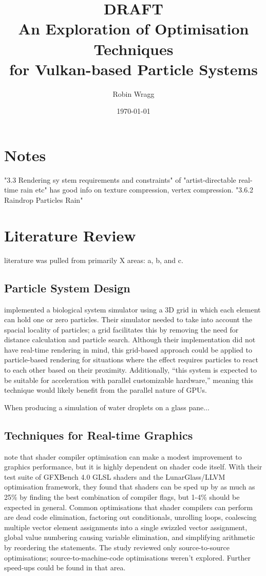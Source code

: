 \documentclass[11pt, a4paper, twocolumn]{article}
\title{\sffamily\bfseries DRAFT\\An Exploration of Optimisation Techniques\\for Vulkan-based Particle Systems}
\author{Robin Wragg}
\date{\today}
\begin{document}
\maketitle

\section{Notes}
"3.3 Rendering sy stem requirements and constraints" of "artist-directable real-time rain etc" has good info on texture compression, vertex compression.
"3.6.2 Raindrop Particles Rain"


\section{Literature Review}

literature was pulled from primarily X areas: a, b, and c.

\subsection{Particle System Design}

\citet{Boulianne2007} implemented a biological system simulator using a 3D grid in which each element can hold one or zero particles. Their simulator needed to take into account the spacial locality of particles; a grid facilitates this by removing the need for distance calculation and particle search. Although their implementation did not have real-time rendering in mind, this grid-based approach could be applied to particle-based rendering for situations where the effect requires particles to react to each other based on their proximity. Additionally, ``this system is expected to be suitable for acceleration with parallel customizable hardware,'' \citep{Boulianne2007} meaning this technique would likely benefit from the parallel nature of GPUs.

When producing a simulation of water droplets on a glass pane... \citet{Chen2012}

\subsection{Techniques for Real-time Graphics}

\citet{Crawford2018} note that shader compiler optimisation can make a modest improvement to graphics performance, but it is highly dependent on shader code itself. With their test suite of GFXBench 4.0 GLSL shaders and the LunarGlass/LLVM optimisation framework, they found that shaders can be sped up by as much as 25\% by finding the best combination of compiler flags, but 1-4\% should be expected in general. Common optimisations that shader compilers can perform are dead code elimination, factoring out conditionals, unrolling loops, coalescing multiple vector element assignments into a single swizzled vector assignment, global value numbering causing variable elimination, and simplifying arithmetic by reordering the statements. The study reviewed only source-to-source optimisations; source-to-machine-code optimisations weren't explored. Further speed-ups could be found in that area.
\end{document}
